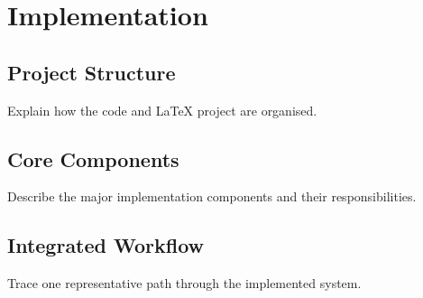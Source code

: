 \chapter{Implementation}

\section{Project Structure}
Explain how the code and LaTeX project are organised.

\section{Core Components}
Describe the major implementation components and their responsibilities.

\section{Integrated Workflow}
Trace one representative path through the implemented system.
